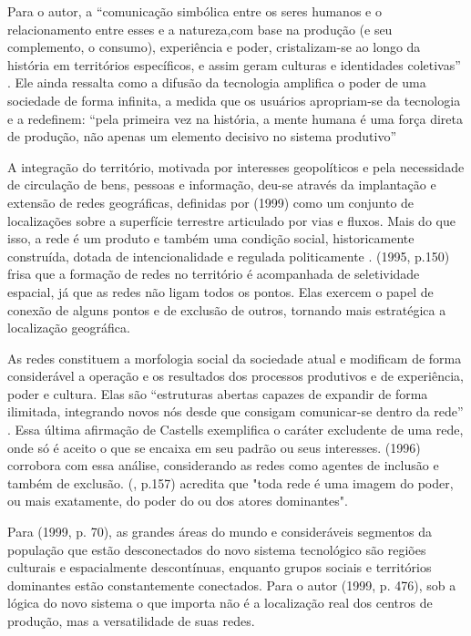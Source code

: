 Para o autor, a “comunicação simbólica entre os seres humanos e o relacionamento entre esses e a natureza,com base na produção (e seu complemento, o consumo), experiência e poder, cristalizam-se ao longo da história em territórios específicos, e assim geram culturas e identidades coletivas” \cite[p. 52-53]{castells1999}. Ele ainda ressalta como a difusão da tecnologia amplifica o poder de uma sociedade de forma infinita, a medida que os usuários apropriam-se da tecnologia e a redefinem: “pela primeira vez na história, a mente humana é uma força direta de produção, não apenas um elemento decisivo no sistema produtivo” \cite{castells1999}

A integração do território, motivada por interesses geopolíticos e pela necessidade de circulação de bens, pessoas e informação, deu-se através da implantação e extensão de redes geográficas, definidas por  (1999) como um conjunto de localizações sobre a superfície terrestre articulado por vias e fluxos. Mais do que isso, a rede é um produto e também uma condição social, historicamente construída, dotada de intencionalidade e regulada politicamente \cite{santos1996}.  (1995, p.150) frisa que a formação de redes no território é acompanhada de seletividade espacial, já que as redes não ligam todos os pontos. Elas exercem o papel de conexão de alguns pontos e de exclusão de outros, tornando mais estratégica a localização geográfica.

As redes constituem a morfologia social da sociedade atual e modificam de forma considerável a operação e os resultados dos processos produtivos e de experiência, poder e cultura. Elas são “estruturas abertas capazes de expandir de forma ilimitada, integrando novos nós desde que consigam comunicar-se dentro da rede” \cite[p. 566]{castells1999}. Essa última afirmação de Castells exemplifica o caráter excludente de uma rede, onde só é aceito o que se encaixa em seu padrão ou seus interesses.  (1996) corrobora com essa análise, considerando as redes como agentes de inclusão e também de exclusão.  (\citeyear{raffestin1993}, p.157) acredita que "toda rede é uma imagem do poder, ou mais exatamente, do poder do ou dos atores dominantes".

Para  (1999, p. 70), as grandes áreas do mundo e consideráveis segmentos da população que estão desconectados do novo sistema tecnológico são regiões culturais e espacialmente descontínuas, enquanto grupos sociais e territórios dominantes estão constantemente conectados. Para o autor (1999, p. 476), sob a lógica do novo sistema o que importa não é a localização real dos centros de produção, mas a versatilidade de suas redes.

